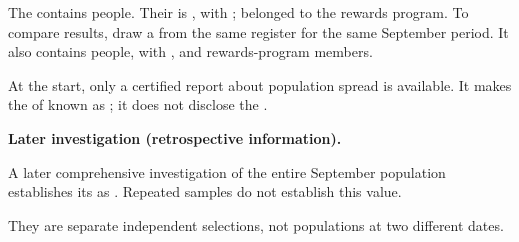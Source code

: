 \begin{probleminfoexcerpt}
The     contains  people. Their    is   , with      ;  belonged to the rewards program. To compare results, draw a     from the same register for the same September period. It also contains  people, with      ,       and  rewards-program members.
\end{probleminfoexcerpt}

\begin{probleminfoexcerpt}
At the start, only a certified report about population spread is available. It makes the    of  known as   ; it does not disclose the   .
\end{probleminfoexcerpt}

\textbf{Later investigation (retrospective information).}

\begin{probleminfoexcerpt}
A later comprehensive investigation of the entire September population establishes its   as   . Repeated samples do not establish this value.
\end{probleminfoexcerpt}

They are separate independent selections, not populations at two different dates.

